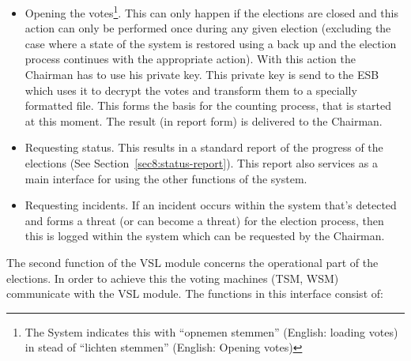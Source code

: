 \begin{itemize}
	\item Opening the votes\footnote{The System indicates this
	with ``opnemen stemmen'' (English: loading votes) in stead of
	``lichten stemmen'' (English: Opening votes)}. This can only
	happen if the elections are closed and this action can only be
	performed once during any given election (excluding the case
	where a state of the system is restored using a back up and
	the election process continues with the appropriate
	action). With this action the Chairman has to use his private
	key. This private key is send to the ESB which uses it to
	decrypt the votes and transform them to a specially formatted
	file. This forms the basis for the counting process, that is
	started at this moment. The result (in report form) is
	delivered to the Chairman.

	\item Requesting status. This results in a standard report of
	the progress of the elections (See
	Section~\ref{sec8:status-report}). This report also services
	as a main interface for using the other functions of the
	system.

	\item Requesting incidents. If an incident occurs within the
	system that's detected and forms a threat (or can become a
	threat) for the election process, then this is logged within
	the system which can be requested by the Chairman.

\end{itemize}

The second function of the VSL module concerns the operational part of
the elections. In order to achieve this the voting machines (TSM, WSM)
communicate with the VSL module. The functions in this interface
consist of:

